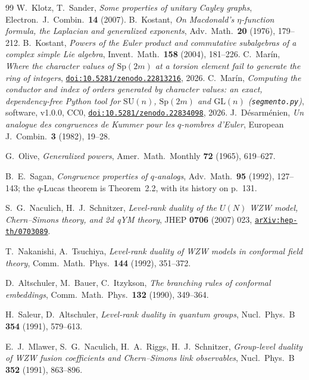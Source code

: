 \documentclass[11pt,a4paper]{article}
\theoremstyle{definition}
\newcommand{\Sp}{\mathrm{Sp}}
\newcommand{\SU}{\mathrm{SU}}
\newcommand{\GL}{\mathrm{GL}}
\begin{document}
\begin{thebibliography}{99}
 W.~Klotz, T.~Sander, \emph{Some properties of unitary Cayley graphs},
Electron.~J.~Combin.~\textbf{14} (2007).
 B.~Kostant, \emph{On Macdonald's $\eta$-function formula, the Laplacian and
generalized exponents}, Adv.~Math.~\textbf{20} (1976), 179--212.
 B.~Kostant, \emph{Powers of the Euler product and commutative subalgebras of a
complex simple Lie algebra}, Invent.~Math.~\textbf{158} (2004), 181--226.
 C.~Mar\'in, \emph{Where the character values of $\Sp(2m)$ at a torsion element fail
to generate the ring of integers}, \href{https://doi.org/10.5281/zenodo.22813216}{\texttt{doi:10.5281/zenodo.22813216}}, 2026.
 C.~Mar\'in, \emph{Computing the conductor and index of orders generated by
character values: an exact, dependency-free Python tool for $\SU(n)$, $\Sp(2m)$ and $\GL(n)$
(\texttt{segmento.py})}, software, v1.0.0, CC0,
\href{https://doi.org/10.5281/zenodo.22834098}{\texttt{doi:10.5281/zenodo.22834098}}, 2026.
 J.~D\'esarm\'enien, \emph{Un analogue des congruences de Kummer pour les
$q$-nombres d'Euler}, European J.~Combin.~\textbf{3} (1982), 19--28.

 G.~Olive, \emph{Generalized powers}, Amer.~Math.~Monthly \textbf{72} (1965),
619--627.

 B.~E.~Sagan, \emph{Congruence properties of $q$-analogs}, Adv.~Math.~\textbf{95}
(1992), 127--143; the $q$-Lucas theorem is Theorem~2.2, with its history on p.~131.

 S.~G.~Naculich, H.~J.~Schnitzer, \emph{Level-rank duality of the $U(N)$ WZW model,
Chern--Simons theory, and 2d qYM theory}, JHEP \textbf{0706} (2007) 023,
\href{https://arxiv.org/abs/hep-th/0703089}{\texttt{arXiv:hep-th/0703089}}.

 T.~Nakanishi, A.~Tsuchiya, \emph{Level-rank duality of WZW models in conformal field
theory}, Comm.~Math.~Phys.~\textbf{144} (1992), 351--372.

 D.~Altschuler, M.~Bauer, C.~Itzykson, \emph{The branching rules of conformal
embeddings}, Comm.~Math.~Phys.~\textbf{132} (1990), 349--364.

 H.~Saleur, D.~Altschuler, \emph{Level-rank duality in quantum groups},
Nucl.~Phys.~B \textbf{354} (1991), 579--613.

 E.~J.~Mlawer, S.~G.~Naculich, H.~A.~Riggs, H.~J.~Schnitzer, \emph{Group-level
duality of WZW fusion coefficients and Chern--Simons link observables}, Nucl.~Phys.~B \textbf{352}
(1991), 863--896.


\end{thebibliography}
\end{document}
